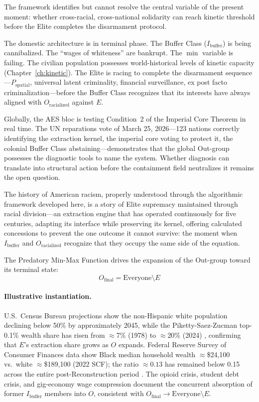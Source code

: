 The framework identifies but cannot resolve the central variable of the present moment: whether cross-racial, cross-national solidarity can reach kinetic threshold before the Elite completes the disarmament protocol.

The domestic architecture is in terminal phase. The Buffer Class ($I_{\text{buffer}}$) is being cannibalized. The ``wages of whiteness'' are bankrupt. The $\min$ variable is failing. The civilian population possesses world-historical levels of kinetic capacity (Chapter~\ref{ch:kinetic}). The Elite is racing to complete the disarmament sequence---$P_{\text{spatial}}$, universal latent criminality, financial surveillance, ex post facto criminalization---before the Buffer Class recognizes that its interests have always aligned with $O_{\text{racialized}}$ against $E$.

Globally, the AES bloc is testing Condition~2 of the Imperial Core Theorem in real time. The UN reparations vote of March 25, 2026---123 nations correctly identifying the extraction kernel, the imperial core voting to protect it, the colonial Buffer Class abstaining---demonstrates that the global Out-group possesses the diagnostic tools to name the system. Whether diagnosis can translate into structural action before the containment field neutralizes it remains the open question.

The history of American racism, properly understood through the algorithmic framework developed here, is a story of Elite supremacy maintained through racial division---an extraction engine that has operated continuously for five centuries, adapting its interface while preserving its kernel, offering calculated concessions to prevent the one outcome it cannot survive: the moment when $I_{\text{buffer}}$ and $O_{\text{racialized}}$ recognize that they occupy the same side of the equation.

The Predatory Min-Max Function drives the expansion of the Out-group toward its terminal state:
\begin{equation}\label{eq:17.2-o-terminal-expansion}
O_{\text{final}} = \text{Everyone} \setminus E
\end{equation}

\paragraph{Illustrative instantiation.} U.S.\ Census Bureau projections show the non-Hispanic white population declining below 50\% by approximately 2045, while the Piketty-Saez-Zucman top-0.1\% wealth share has risen from $\approx$7\% (1978) to $\approx$20\% (2024) \cite{piketty_saez_zucman_2018, piketty_wid}, confirming that $E$'s extraction share grows as $O$ expands. Federal Reserve Survey of Consumer Finances data show Black median household wealth $\approx$\$24,100 vs.\ white $\approx$\$189,100 (2022 SCF); the ratio $\approx 0.13$ has remained below 0.15 across the entire post-Reconstruction period \cite{hamilton_darity_2017}. The opioid crisis, student debt crisis, and gig-economy wage compression document the concurrent absorption of former $I_{\text{buffer}}$ members into $O$, consistent with $O_{\text{final}} \to \text{Everyone} \setminus E$.

